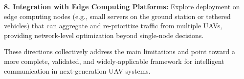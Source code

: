\documentclass[pdflatex,sn-mathphys-num]{sn-jnl}%
\theoremstyle{thmstyleone}%
\theoremstyle{thmstyletwo}%
\theoremstyle{thmstylethree}%
\begin{document}
\textbf{8. Integration with Edge Computing Platforms:} Explore deployment on edge computing nodes (e.g., small servers on the ground station or tethered vehicles) that can aggregate and re-prioritize traffic from multiple UAVs, providing network-level optimization beyond single-node decisions.

These directions collectively address the main limitations and point toward a more complete, validated, and widely-applicable framework for intelligent communication in next-generation UAV systems.





\end{document}
